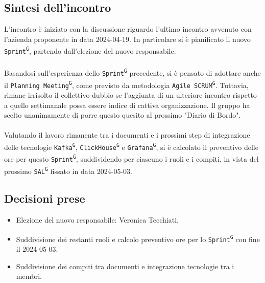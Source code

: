 \documentclass[8pt]{article}
\newcommand{\glossterm}[1]{#1\textsuperscript{G}} %
\begin{document}
\subsection{Sintesi dell'incontro}
L'incontro è iniziato con la discussione riguardo l'ultimo incontro avvenuto con l'azienda proponente in data 2024-04-19. In particolare si è pianificato il nuovo \texttt{\glossterm{Sprint}}, partendo dall'elezione del nuovo responsabile. \\~\\Basandosi sull'esperienza dello \texttt{\glossterm{Sprint}} precedente, si è pensato di adottare anche il \texttt{\glossterm{Planning Meeting}}, come previsto da metodologia \texttt{\glossterm{Agile SCRUM}}. Tuttavia, rimane irrisolto il collettivo dubbio se l'aggiunta di un ulteriore incontro rispetto a quello settimanale possa essere indice di cattiva organizzazione. Il gruppo ha scelto unanimamente di porre questo quesito al prossimo "Diario di Bordo". \\~\\Valutando il lavoro rimanente tra i documenti e i prossimi step di integrazione delle tecnologie \texttt{\glossterm{Kafka}}, \texttt{\glossterm{ClickHouse}} e \texttt{\glossterm{Grafana}}, si è calcolato il preventivo delle ore per questo \texttt{\glossterm{Sprint}}, suddividendo per ciascuno i ruoli e i compiti, in vista del prossimo \texttt{\texttt{\glossterm{SAL}}} fissato in data 2024-05-03.
\subsection{Decisioni prese}
\begin{itemize}
	\setlength\itemsep{0em}
	\item Elezione del nuovo responsabile: Veronica Tecchiati.
	\item Suddivisione dei restanti ruoli e calcolo preventivo ore per lo \texttt{\glossterm{Sprint}} con fine il 2024-05-03.
	\item Suddivisione dei compiti tra documenti e integrazione tecnologie tra i membri.
\end{itemize}
\newpage
\end{document}
